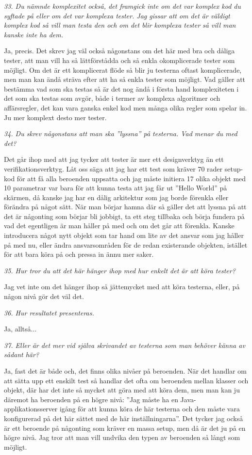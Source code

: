 \documentclass[11pt]{article}
\begin{document}
\emph{33. Du nämnde komplexitet också, det framgick inte om det var komplex kod du syftade på eller om det var komplexa tester. Jag gissar att om det är väldigt komplex kod så vill man testa den och om det blir komplexa tester så vill man kanske inte ha dem.}

Ja, precis. Det skrev jag väl också någonstans om det här med bra och dåliga tester, att man vill ha så lättförstådda och så enkla okomplicerade tester som möjligt. Om det är ett komplicerat flöde så blir ju testerna oftast komplicerade, men man kan ändå sträva efter att ha så enkla tester som möjligt. Vad gäller att bestämma vad som ska testas så är det nog ändå i första hand komplexiteten i det som ska testas som avgör, både i termer av komplexa algoritmer och affärsregler, det kan vara ganska enkel kod men många olika regler som spelar in. Ju mer komplext desto mer tester.

\emph{34. Du skrev någonstans att man ska ”lyssna” på testerna. Vad menar du med det?}

Det går ihop med att jag tycker att tester är mer ett designverktyg än ett verifikationsverktyg. Låt oss säga att jag har ett test som kräver 70 rader setup-kod för att få alla beroenden uppsatta och jag måste initiera 17 olika objekt med 10 parametrar var bara för att kunna testa att jag får ut ”Hello World” på skärmen, då kanske jag har en dålig arkitektur som jag borde förenkla eller förändra på något sätt. När man börjar hamna där så gäller det att lyssna på att det är någonting som börjar bli jobbigt, ta ett steg tillbaka och börja fundera på vad det egentligen är man håller på med och om det går att förenkla. Kanske introducera något nytt objekt som tar hand om lite av det ansvar som jag håller på med nu, eller ändra ansvarsområden för de redan existerande objekten, istället för att bara köra på och pressa in ännu mer saker.

\emph{35. Hur tror du att det här hänger ihop med hur enkelt det är att köra tester?}

Jag vet inte om det hänger ihop så jättemycket med att köra testerna, eller, på någon nivå gör det väl det.

\emph{36. Hur resultatet presenteras.}

Ja, alltså...

\emph{37. Eller är det mer vid själva skrivandet av testerna som man behöver känna av sådant här?}

Ja, fast det är både och, det finns olika nivåer på beroenden. När det handlar om att sätta upp ett enskilt test så handlar det ofta om beroenden mellan klasser och objekt, där har det inte så mycket att göra med att köra dem, men man kan ju däremot ha beroenden på en högre nivå: ”Jag måste ha en Java-applikationsserver igång för att kunna köra de här testerna och den måste vara konfigurerad på det här sättet med de här inställningarna”. Det tycker jag också är ett beroende på någonting som kräver en massa setup, men då är det ju på en högre nivå. Jag tror att man vill undvika den typen av beroenden så långt som möjligt.
\end{document}

